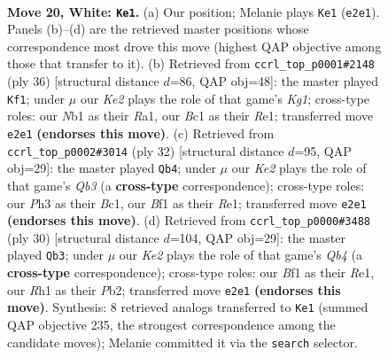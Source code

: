 \documentclass[11pt]{article}
\begin{document}
\clearpage

\begin{figure}[p]\centering
\begin{subfigure}{0.46\textwidth}\centering
\resizebox{\linewidth}{!}{%
\newchessgame
\chessboard[
  setfen={r3k2r/4bp2/b4n2/p2pp3/3q2pp/4Q2P/PP2KPP1/RNB2B1R w kq - 2 20},
  showmover=false,
  pgfstyle=straightmove, color=movearrow, markmove={e2-e1}
]}
\caption{}
\end{subfigure}\hfill
\begin{subfigure}{0.46\textwidth}\centering
\resizebox{\linewidth}{!}{%
\newchessgame
\chessboard[
  setfen={r3k2r/ppb2pp1/2pqp1n1/8/P2PQ2p/2PB3P/1P3PP1/R1B1R1K1 w kq - 1 19},
  showmover=false,
  pgfstyle=straightmove, color=movearrow, markmove={g1-f1}
]}
\caption{}
\end{subfigure}
\\[4pt]
\begin{subfigure}{0.46\textwidth}\centering
\resizebox{\linewidth}{!}{%
\newchessgame
\chessboard[
  setfen={r1b2rk1/1p3ppp/2q2n2/8/p1Bp4/1QP5/PP3PPP/R1B1R1K1 w - - 0 17},
  showmover=false,
  pgfstyle=straightmove, color=movearrow, markmove={b3-b4}
]}
\caption{}
\end{subfigure}\hfill
\begin{subfigure}{0.46\textwidth}\centering
\resizebox{\linewidth}{!}{%
\newchessgame
\chessboard[
  setfen={r1b2rk1/1p3ppp/2q2n2/p7/1QBp4/2P5/PP3PPP/R1B1R1K1 w - - 0 16},
  showmover=false,
  pgfstyle=straightmove, color=movearrow, markmove={b4-b3}
]}
\caption{}
\end{subfigure}
\caption{\textbf{Move 20, White: \texttt{Ke1}.} (a) Our position; Melanie plays \texttt{Ke1} (\texttt{e2e1}). Panels (b)--(d) are the retrieved master positions whose correspondence most drove this move (highest QAP objective among those that transfer to it). (b) Retrieved from \texttt{ccrl\_top\_p0001\#2148} (ply 36) [structural distance $d$=86, QAP obj=48]: the master played \texttt{Kf1}; under $\mu$ our \emph{Ke2} plays the role of that game's \emph{Kg1}; cross-type roles: our \emph{N}b1 as their \emph{R}a1, our \emph{B}c1 as their \emph{R}e1; transferred move \texttt{e2e1} \textbf{(endorses this move)}. (c) Retrieved from \texttt{ccrl\_top\_p0002\#3014} (ply 32) [structural distance $d$=95, QAP obj=29]: the master played \texttt{Qb4}; under $\mu$ our \emph{Ke2} plays the role of that game's \emph{Qb3} (a \textbf{cross-type} correspondence); cross-type roles: our \emph{P}h3 as their \emph{B}c1, our \emph{B}f1 as their \emph{R}e1; transferred move \texttt{e2e1} \textbf{(endorses this move)}. (d) Retrieved from \texttt{ccrl\_top\_p0000\#3488} (ply 30) [structural distance $d$=104, QAP obj=29]: the master played \texttt{Qb3}; under $\mu$ our \emph{Ke2} plays the role of that game's \emph{Qb4} (a \textbf{cross-type} correspondence); cross-type roles: our \emph{B}f1 as their \emph{R}e1, our \emph{R}h1 as their \emph{P}b2; transferred move \texttt{e2e1} \textbf{(endorses this move)}. Synthesis: 8 retrieved analogs transferred to \texttt{Ke1} (summed QAP objective 235, the strongest correspondence among the candidate moves); Melanie committed it via the \texttt{search} selector.}
\label{fig:thought-m38}
\end{figure}
\end{document}
